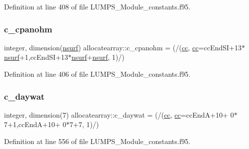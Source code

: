 Definition at line 408 of file L\+U\+M\+P\+S\+\_\+\+Module\+\_\+constants.\+f95.

\mbox{\label{namespaceallocatearray_a1327a23cdaae83ba7b37451d97284802}} 
\subsubsection{\texorpdfstring{c\+\_\+cpanohm}{c\_cpanohm}}
{\footnotesize\ttfamily integer, dimension(\hyperlink{namespaceallocatearray_acd22f92a06f7e9a2a91426b3dc99fdb0}{nsurf}) allocatearray\+::c\+\_\+cpanohm = (/(\hyperlink{namespaceallocatearray_ac863c81704eb507dee10f5e10741e10c}{cc}, \hyperlink{namespaceallocatearray_ac863c81704eb507dee10f5e10741e10c}{cc}=cc\+End\+SI+13$\ast$\hyperlink{namespaceallocatearray_acd22f92a06f7e9a2a91426b3dc99fdb0}{nsurf}+1,cc\+End\+SI+13$\ast$\hyperlink{namespaceallocatearray_acd22f92a06f7e9a2a91426b3dc99fdb0}{nsurf}+\hyperlink{namespaceallocatearray_acd22f92a06f7e9a2a91426b3dc99fdb0}{nsurf}, 1)/)}



Definition at line 406 of file L\+U\+M\+P\+S\+\_\+\+Module\+\_\+constants.\+f95.

\mbox{\label{namespaceallocatearray_a5740982b90c4175594f06cec32d0c8d7}} 
\subsubsection{\texorpdfstring{c\+\_\+daywat}{c\_daywat}}
{\footnotesize\ttfamily integer, dimension(7) allocatearray\+::c\+\_\+daywat = (/(\hyperlink{namespaceallocatearray_ac863c81704eb507dee10f5e10741e10c}{cc}, \hyperlink{namespaceallocatearray_ac863c81704eb507dee10f5e10741e10c}{cc}=cc\+EndA+10+ 0$\ast$7+1,cc\+EndA+10+ 0$\ast$7+7, 1)/)}



Definition at line 556 of file L\+U\+M\+P\+S\+\_\+\+Module\+\_\+constants.\+f95.

\mbox{\label{namespaceallocatearray_a3222aa35653c2b388e922ec6f5dde9f1}} 
